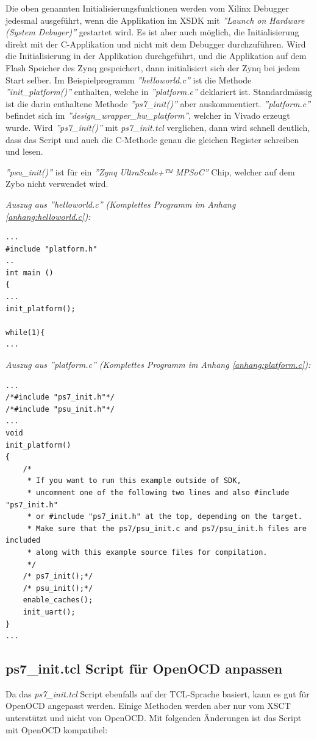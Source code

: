 Die oben genannten Initialisierungsfunktionen werden vom Xilinx Debugger jedesmal ausgeführt, wenn die Applikation im XSDK mit \textit{''Launch on Hardware (System Debuger)''} gestartet wird.
Es ist aber auch möglich, die Initialisierung direkt mit der C-Applikation und nicht mit dem Debugger durchzuführen.
Wird die Initialisierung in der Applikation durchgeführt, und die Applikation auf dem Flash Speicher des Zynq gespeichert, dann initialisiert sich der Zynq bei jedem Start selber.
Im Beispielprogramm \textit{''helloworld.c''} ist die Methode \textit{''init\_platform()''} enthalten, welche in \textit{''platform.c''} deklariert ist.
Standardmässig ist die darin enthaltene Methode \textit{''ps7\_init()''} aber auskommentiert.
\textit{''platform.c''} befindet sich im \textit{''design\_wrapper\_hw\_platform''}, welcher in Vivado erzeugt wurde.
Wird \textit{''ps7\_init()''} mit \textit{ps7\_init.tcl} verglichen, dann wird schnell deutlich, dass das Script und auch die C-Methode genau die gleichen Register schreiben und lesen.

\textit{''psu\_init()''} ist für ein \textit{''Zynq UltraScale+™ MPSoC''} Chip, welcher auf dem Zybo nicht verwendet wird.


\textit{Auszug aus ''helloworld.c'' (Komplettes Programm im Anhang \ref{anhang:helloworld.c}):}
\lstset{language=c}
\begin{lstlisting}[frame=single]
...
#include "platform.h"
..
int main ()
{
...
init_platform();

while(1){
...
\end{lstlisting}



\textit{Auszug aus ''platform.c'' (Komplettes Programm im Anhang \ref{anhang:platform.c}):}
\lstset{language=c}
\begin{lstlisting}[frame=single]
...
/*#include "ps7_init.h"*/
/*#include "psu_init.h"*/
...
void
init_platform()
{
    /*
     * If you want to run this example outside of SDK,
     * uncomment one of the following two lines and also #include "ps7_init.h"
     * or #include "ps7_init.h" at the top, depending on the target.
     * Make sure that the ps7/psu_init.c and ps7/psu_init.h files are included
     * along with this example source files for compilation.
     */
    /* ps7_init();*/
    /* psu_init();*/
    enable_caches();
    init_uart();
}
...

\end{lstlisting}




\subsection{ps7\_init.tcl Script für OpenOCD anpassen}
Da das \textit{ps7\_init.tcl} Script ebenfalls auf der TCL-Sprache basiert, kann es gut für OpenOCD angepasst werden.
Einige Methoden werden aber nur vom XSCT unterstützt und nicht von OpenOCD.
Mit folgenden Änderungen ist das Script mit OpenOCD kompatibel:

